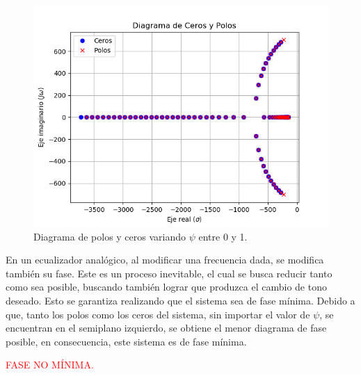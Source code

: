 \documentclass[a4paper]{article}
\begin{document}
\begin{figure}[H]
	\includegraphics[width=\textwidth]{Imagenes/Zplanepsi.png}
\caption{Diagrama de polos y ceros variando $\psi$ entre 0 y 1.}
	\label{fig:zplanepsi}
\end{figure}

En un ecualizador analógico, al modificar una frecuencia dada, se modifica también su fase. Este es un proceso inevitable, el cual se busca reducir tanto como sea posible, buscando también lograr que produzca el cambio de tono deseado. Esto se garantiza realizando que el sistema sea de fase mínima.
Debido a que, tanto los polos como los ceros del sistema, sin importar el valor de $\psi$, se encuentran en el semiplano izquierdo, se obtiene el menor diagrama de fase posible, en consecuencia, este sistema es de fase mínima.

\begin{center}
	\textcolor{red}{FASE NO MÍNIMA.}
\end{center}

%
%
\end{document}
